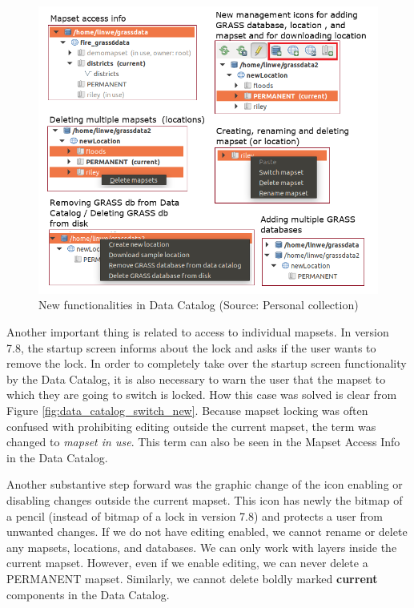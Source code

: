 \documentclass[a4paper,10pt,twoside]{article}
\begin{document}
\vspace{0.3cm}
\begin{figure}[hbt!] 
\begin{center}
\includegraphics[width=15cm]{../pictures/funkce.png} 
\caption[New functionalities in Data Catalog]{New functionalities in Data Catalog (Source: Personal collection)}
\label{fig:function}
\end{center}
\end{figure}

\newpage
\noindent Another important thing is related to access to individual
mapsets. In version 7.8, the startup screen informs about the lock and
asks if the user wants to remove the lock. In order to completely take
over the startup screen functionality by the Data Catalog, it is also
necessary to warn the user that the mapset to which they are going to
switch is locked. How this case was solved is clear from Figure
\ref{fig:data_catalog_switch_new}. Because mapset locking was often
confused with prohibiting editing outside the current mapset, the term
was changed to \textit{mapset in use}. This term can also be seen in
the Mapset Access Info in the Data Catalog.

Another substantive step forward was the graphic change of the icon
enabling or disabling changes outside the current mapset. This icon
has newly the bitmap of a pencil (instead of bitmap of a lock in
version 7.8) and protects a user from unwanted changes. If we do not
have editing enabled, we cannot rename or delete any mapsets,
locations, and databases. We can only work with layers inside the
current mapset. However, even if we enable editing, we can never
delete a PERMANENT mapset. Similarly, we cannot delete boldly marked
\textbf{current} components in the Data Catalog.
\end{document}
